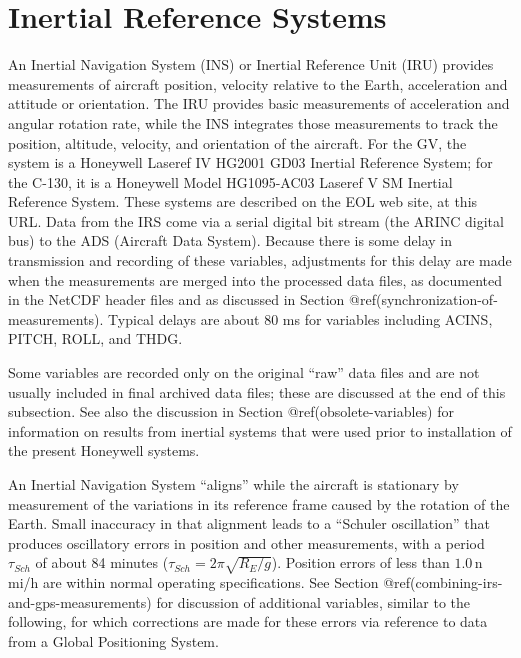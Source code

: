 \documentclass[
  english,
]{book}
\begin{document}
\hypertarget{inertial-reference-systems}{%
\section{Inertial Reference Systems}\label{inertial-reference-systems}}

An Inertial Navigation System (INS) or Inertial Reference Unit (IRU)
provides measurements of aircraft position, velocity relative to the
Earth, acceleration and attitude or orientation. The IRU provides basic
measurements of acceleration and angular rotation rate, while the INS
integrates those measurements to track the position, altitude, velocity,
and orientation of the aircraft. For the GV, the system is a Honeywell
Laseref IV HG2001 GD03 Inertial Reference System; for the C-130, it is a
Honeywell Model HG1095-AC03 Laseref V SM Inertial Reference System.
These systems are described on the EOL web site, at this URL. Data from
the IRS come via a serial digital bit stream (the ARINC digital bus) to
the ADS (Aircraft Data System). Because there is some delay in
transmission and recording of these variables, adjustments for this
delay are made when the measurements are merged into the processed data
files, as documented in the NetCDF header files and as discussed in
Section @ref(synchronization-of-measurements). Typical delays are about
80 ms for variables including ACINS, PITCH, ROLL, and THDG.

Some variables are recorded only on the original ``raw'' data files and
are not usually included in final archived data files; these are
discussed at the end of this subsection. See also the discussion in
Section @ref(obsolete-variables) for information on results from
inertial systems that were used prior to installation of the present
Honeywell systems.

An Inertial Navigation System ``aligns'' while the aircraft is
stationary by measurement of the variations in its reference frame
caused by the rotation of the Earth. Small inaccuracy in that alignment
leads to a ``Schuler oscillation'' that produces oscillatory errors in
position and other measurements, with a period \(\tau_{Sch}\) of about
84 minutes (\(\tau_{Sch}=2\pi\sqrt{R_{E}/g}\)). Position errors of less
than \(1.0\,\)n mi/h are within normal operating specifications. See
Section @ref(combining-irs-and-gps-measurements) for discussion of
additional variables, similar to the following, for which corrections
are made for these errors via reference to data from a Global
Positioning System.
\end{document}
